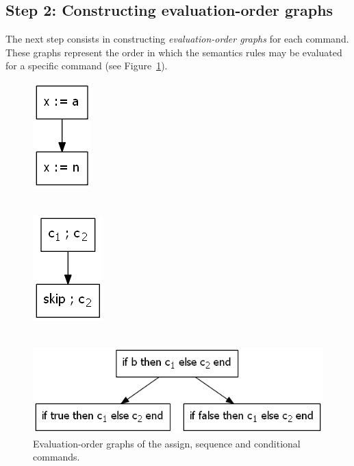 \documentclass[conference]{IEEEtran}
\begin{document}
\subsection{Step 2: Constructing evaluation-order graphs}
The next step consists in constructing \emph{evaluation-order graphs} for each command. These graphs represent the order in which the semantics rules may be evaluated for a specific command (see Figure~\ref{figure:evaluation-order-graphs}).
\begin{figure}[h]
\begin{minipage}{0.49\linewidth}
	\center
\includegraphics[width=0.33\linewidth]{images/graph-assign.png}~\\~\\
\end{minipage}
\begin{minipage}{0.49\linewidth}
	\center
	\includegraphics[width=0.4\linewidth]{images/graph-sequence.png}~\\~\\
\end{minipage}
\includegraphics[width=\linewidth]{images/graph-if.png}
\caption{Evaluation-order graphs of the assign, sequence and conditional commands.}
\label{figure:evaluation-order-graphs}
\end{figure}
\end{document}
